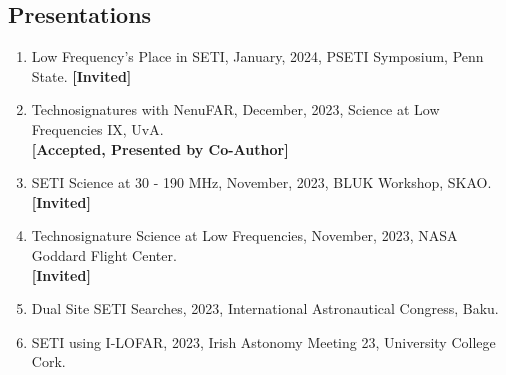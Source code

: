 \documentclass[a4paper,12pt]{article}
\numberwithin{equation}{section}
\begin{document}
\subsection*{Presentations}
\begin{enumerate}
\item Low Frequency's Place in SETI, January, 2024, PSETI Symposium, Penn State. \hfill \textbf{[Invited]}
\item Technosignatures with NenuFAR, December, 2023, Science at Low Frequencies IX, UvA. \\  \hfill \textbf{[Accepted, Presented by Co-Author]}
\item SETI Science at 30 - 190 MHz, November, 2023, BLUK Workshop, SKAO.\\ \textbf{[Invited]}
\item Technosignature Science at Low Frequencies, November, 2023, NASA Goddard Flight Center. \hfill \\ \textbf{[Invited]}
\item Dual Site SETI Searches, 2023, International Astronautical Congress, Baku. 
\item SETI using I-LOFAR, 2023, Irish Astonomy Meeting 23, University College Cork. 
\end{enumerate}

\newpage
\end{document}
